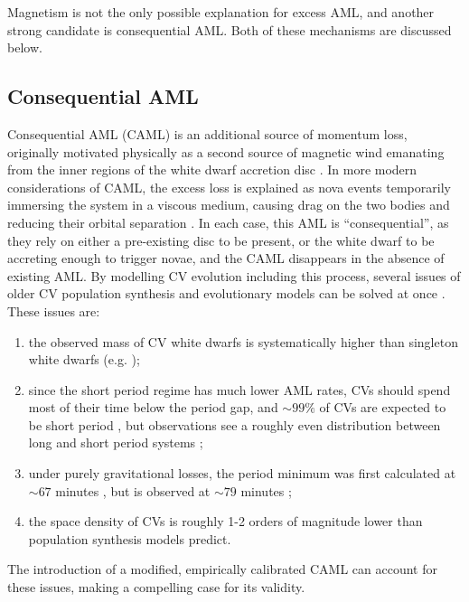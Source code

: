 Magnetism is not the only possible explanation for excess AML, and another strong candidate is consequential AML. Both of these mechanisms are discussed below.


\subsection{Consequential AML}
\label{sect:introduction:CAML}

Consequential AML (CAML) is an additional source of momentum loss, originally motivated physically as a second source of magnetic wind emanating from the inner regions of the white dwarf accretion disc \citep{king1995,schenker1998}. In more modern considerations of CAML, the excess loss is explained as nova events temporarily immersing the system in a viscous medium, causing drag on the two bodies and reducing their orbital separation \citep{Schreiber2016}.
In each case, this AML is ``consequential'', as they rely on either a pre-existing disc to be present, or the white dwarf to be accreting enough to trigger novae, and the CAML disappears in the absence of existing AML.
By modelling CV evolution including this process, several issues of older CV population synthesis and evolutionary models can be solved at once \citep{Schreiber2016}. These issues are: 
\begin{enumerate}
    \item the observed mass of CV white dwarfs is systematically higher than singleton white dwarfs (e.g. \citealt{McAllister2019,pala2020});
    \item since the short period regime has much lower AML rates, CVs should spend most of their time below the period gap, and $\sim 99\%$ of CVs are expected to be short period \citep{kolb1993a}, but observations see a roughly even distribution between long and short period systems \citep{knigge2006};
    \item under purely gravitational losses, the period minimum was first calculated at $\sim 67$ minutes \citep{kolb99}, but is observed at $\sim 79$ minutes \citep{McAllister2019};
    \item the space density of CVs is roughly 1-2 orders of magnitude lower than population synthesis models predict.
\end{enumerate} 
The introduction of a modified, empirically calibrated CAML can account for these issues, making a compelling case for its validity. 


